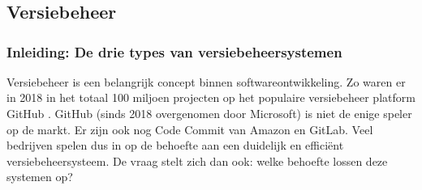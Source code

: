 \chapter{}
\label{ch:stand-van-zaken}
\graphicspath{{../../Images/}} 




\section{Versiebeheer}
\subsection{Inleiding: De drie types van versiebeheersystemen}
\label{sec:vb_inleiding}
Versiebeheer is een belangrijk concept binnen softwareontwikkeling. Zo waren er in 2018 in het  totaal 100 miljoen projecten op het populaire versiebeheer platform GitHub \autocite{Git2018}. GitHub (sinds 2018 overgenomen door Microsoft) is niet de enige speler op de markt. Er zijn ook nog Code Commit van Amazon en GitLab. Veel bedrijven spelen dus in op de behoefte aan een duidelijk en efficiënt versiebeheersysteem. De vraag stelt zich dan ook: welke behoefte lossen deze systemen op?

